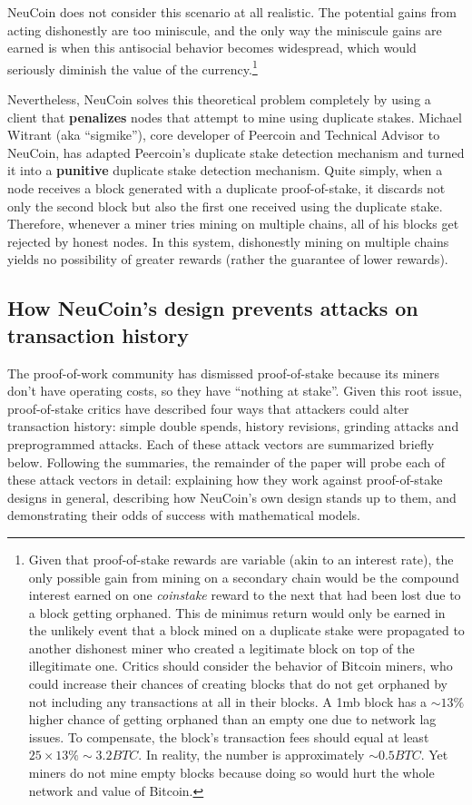 \documentclass[a4paper,11pt]{article}
\begin{document}
NeuCoin does not consider this scenario at all realistic. The potential gains from acting dishonestly are too miniscule, and the only way the miniscule gains are earned is when this antisocial behavior becomes widespread, which would seriously diminish the value of the currency.\footnote{Given that proof-of-stake rewards are variable (akin to an interest rate), the only possible gain from mining on a secondary chain would be the compound interest earned on one \textit{coinstake} reward to the next that had been lost due to a block getting orphaned. This de minimus return would only be earned in the unlikely event that a block mined on a duplicate stake were propagated to another dishonest miner who created a legitimate block on top of the illegitimate one. Critics should consider the behavior of Bitcoin miners, who could increase their chances of creating blocks that do not get orphaned by not including any transactions at all in their blocks. A 1mb block has a $\sim13\%$ higher chance of getting orphaned than an empty one due to network lag issues\cite{gavintx}. To compensate, the block's transaction fees should equal at least $25\times13\%\sim3.2BTC$. In reality, the number is approximately $\sim 0.5 BTC$. Yet miners do not mine empty blocks because doing so would hurt the whole network and value of Bitcoin. }

Nevertheless, NeuCoin solves this theoretical problem completely by using a client that \textbf{penalizes} nodes that attempt to mine using duplicate stakes. Michael Witrant (aka ``sigmike''), core developer of Peercoin and Technical Advisor to NeuCoin, has adapted Peercoin's duplicate stake detection mechanism and turned it into a \textbf{punitive} duplicate stake detection mechanism. Quite simply, when a node receives a block generated with a duplicate proof-of-stake, it discards not only the second block but also the first one received using the duplicate stake. Therefore, whenever a miner tries mining on multiple chains, all of his blocks get rejected by honest nodes. In this system, dishonestly mining on multiple chains yields no possibility of greater rewards (rather the guarantee of lower rewards).


\subsection{How NeuCoin's design prevents attacks on transaction history}

The proof-of-work community has dismissed proof-of-stake because its miners don't have operating costs, so they have ``nothing at stake''. Given this root issue, proof-of-stake critics have described four ways that attackers could alter transaction history: simple double spends, history revisions, grinding attacks and preprogrammed attacks. Each of these attack vectors are summarized briefly below. Following the summaries, the remainder of the paper will probe each of these attack vectors in detail: explaining how they work against proof-of-stake designs in general, describing how NeuCoin's own design stands up to them, and demonstrating their odds of success with mathematical models.
\end{document}
